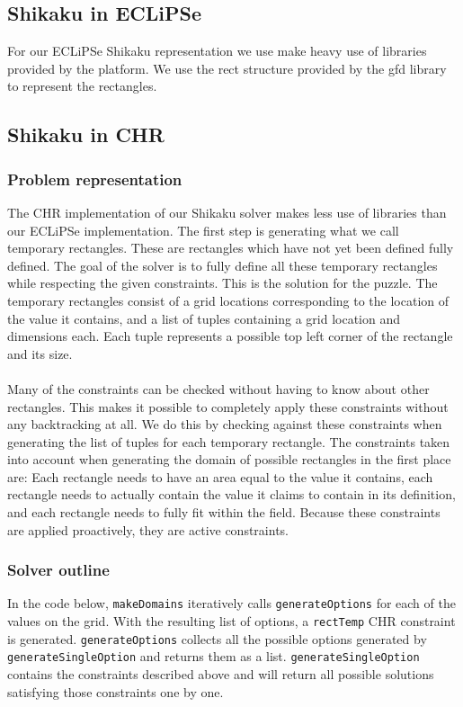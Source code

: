 \subsection{Shikaku in ECLiPSe}
For our ECLiPSe Shikaku representation we use make heavy use of libraries provided by the platform. We use the rect structure provided by the gfd library to represent the rectangles.

\subsection{Shikaku in CHR}
\subsubsection{Problem representation}
The CHR implementation of our Shikaku solver makes less use of libraries than our ECLiPSe implementation. The first step is generating what we call temporary rectangles. These are rectangles which have not yet been defined fully defined. The goal of the solver is to fully define all these temporary rectangles while respecting the given constraints. This is the solution for the puzzle. The temporary rectangles consist of a grid locations corresponding to the location of the value it contains, and a list of tuples containing a grid location and dimensions each. Each tuple represents a possible top left corner of the rectangle and its size. 
\\ \\
Many of the constraints can be checked without having to know about other rectangles. This makes it possible to completely apply these constraints without any backtracking at all. We do this by checking against these constraints when generating the list of tuples for each temporary rectangle. The constraints taken into account when generating the domain of possible rectangles in the first place are: Each rectangle needs to have an area equal to the value it contains, each rectangle needs to actually contain the value it claims to contain in its definition, and each rectangle needs to fully fit within the field. Because these constraints are applied proactively, they are active constraints.

\subsubsection{Solver outline}
In the code below,  \texttt{makeDomains} iteratively calls \texttt{generateOptions} for each of the values on the grid. With the resulting list of options, a \texttt{rectTemp} CHR constraint is generated. \texttt{generateOptions} collects all the possible options generated by \texttt{generateSingleOption} and returns them as a list. \texttt{generateSingleOption} contains the constraints described above and will return all possible solutions satisfying those constraints one by one. 

